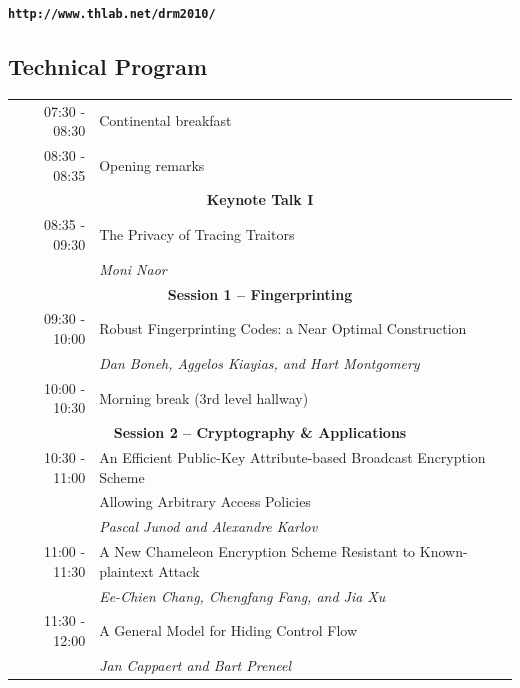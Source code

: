 \documentclass{article}
\begin{document}
\begin{tabularx}{\linewidth}
  \centerline{\bfseries\large\texttt{http://www.thlab.net/drm2010/}}

  \vspace{-2mm}
  \subsection*{Technical Program}
\begin{tabular}{rl}
\textcolor[rgb]{.3,.3,.3}{07:30 - 08:30}  &\textcolor[rgb]{.3,.3,.3}{Continental breakfast}\\[1mm]
08:30 - 08:35 	& Opening remarks\\[1mm]
\multicolumn{2}{c}{\bfseries\large\textcolor[rgb]{0,.02,.4}{Keynote Talk I}}\\
08:35 - 09:30 	&
	\textcolor[rgb]{0,.18,.5}{The Privacy of Tracing Traitors}\\
&\textcolor[rgb]{0,.2,.5}{\itshape Moni Naor}\\[1mm]
 \multicolumn{2}{c}{\bfseries\large Session 1 -- Fingerprinting}\\
09:30 - 10:00 &	Robust Fingerprinting Codes: a Near Optimal Construction\\
&{\textit{Dan Boneh, Aggelos Kiayias, and Hart Montgomery}}\\[1mm]
\textcolor[rgb]{.3,.3,.3}{10:00 - 10:30} 	& \textcolor[rgb]{.3,.3,.3}{Morning break (3rd level hallway)}\\[1mm]

 \multicolumn{2}{c}{\bfseries\large Session 2 -- Cryptography \& Applications}\\
10:30 - 11:00 &	An Efficient Public-Key Attribute-based Broadcast Encryption Scheme\\& Allowing Arbitrary Access Policies\\
&\textit{Pascal Junod and Alexandre Karlov}\\
11:00 - 11:30 &	A New Chameleon Encryption Scheme Resistant to Known-plaintext Attack\\
&\textit{Ee-Chien Chang, Chengfang Fang, and Jia Xu}\\
11:30 - 12:00 &	A General Model for Hiding Control Flow\\
&\textit{Jan Cappaert and Bart Preneel}\\[1mm]


\end{tabular}
\end{tabularx}
\end{document}

